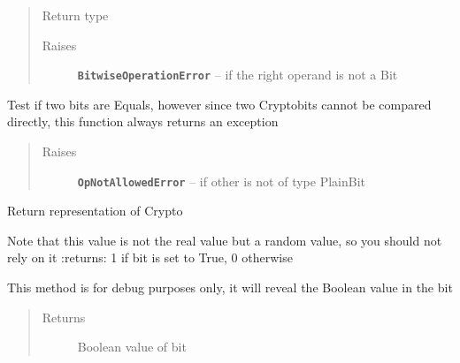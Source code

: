 \documentclass[letterpaper,10pt,english]{sphinxmanual}
\begin{document}
\begin{fulllineitems}
\begin{fulllineitems}
\begin{quote}
\begin{description}
\item[{Return type}] \leavevmode
{\hyperref[datatypes.bits:datatypes.bits.Bit.CryptoBit]{}}

\item[{Raises}] \leavevmode
\textbf{\texttt{BitwiseOperationError}} -- if the right operand is not a Bit

\end{description}\end{quote}

\end{fulllineitems}


\begin{fulllineitems}
\label{datatypes.bits:datatypes.bits.Bit.CryptoBit.__eq__}
Test if two bits are Equals, however since two Cryptobits cannot be compared directly, this function always returns an exception
\begin{quote}\begin{description}
\item[{Raises}] \leavevmode
\textbf{\texttt{OpNotAllowedError}} -- if other is not of type PlainBit

\end{description}\end{quote}

\end{fulllineitems}


\begin{fulllineitems}
\label{datatypes.bits:datatypes.bits.Bit.CryptoBit.__repr__}
Return representation of Crypto

Note that this value is not the real value but a random value, so you should not rely on it
:returns: 1 if bit is set to True, 0 otherwise

\end{fulllineitems}


\begin{fulllineitems}
\label{datatypes.bits:datatypes.bits.Bit.CryptoBit.debug__printAsBoolean}
This method is for debug purposes only, it will reveal the Boolean value in the bit
\begin{quote}\begin{description}
\item[{Returns}] \leavevmode
Boolean value of bit


\end{description}
\end{quote}
\end{fulllineitems}
\end{fulllineitems}
\end{document}
